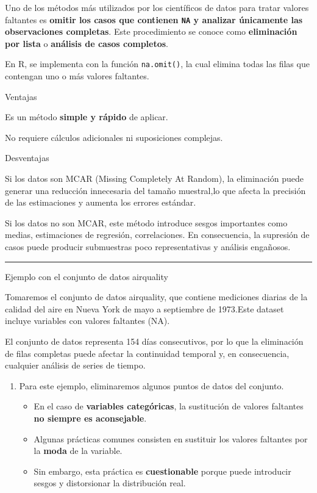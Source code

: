 \documentclass[
]{book}
\providecommand{\tightlist}{%
  \setlength{\itemsep}{0pt}\setlength{\parskip}{0pt}}
\begin{document}
Uno de los métodos más utilizados por los científicos de datos para tratar valores faltantes es \textbf{omitir los casos que contienen \texttt{NA} y analizar únicamente las observaciones completas}. Este procedimiento se conoce como \textbf{eliminación por lista} o \textbf{análisis de casos completos}.

En R, se implementa con la función \texttt{na.omit()}, la cual elimina todas las filas que contengan uno o más valores faltantes.

{} Ventajas

Es un método \textbf{simple y rápido} de aplicar.

No requiere cálculos adicionales ni suposiciones complejas.

{}Desventajas

Si los datos son MCAR (Missing Completely At Random), la eliminación puede generar una reducción innecesaria del tamaño muestral,lo que afecta la precisión de las estimaciones y aumenta los errores estándar.

Si los datos no son MCAR, este método introduce sesgos importantes como medias, estimaciones de regresión, correlaciones. En consecuencia, la supresión de casos puede producir submuestras poco representativas y análisis engañosos.

\begin{center}\rule{0.5\linewidth}{0.5pt}\end{center}

{} Ejemplo con el conjunto de datos airquality

Tomaremos el conjunto de datos airquality, que contiene mediciones diarias de la calidad del aire en Nueva York de mayo a septiembre de 1973.Este dataset incluye variables con valores faltantes (NA).

El conjunto de datos representa 154 días consecutivos, por lo que la eliminación de filas completas puede afectar la continuidad temporal y, en consecuencia, cualquier análisis de series de tiempo.

\begin{enumerate}
\def\labelenumi{\arabic{enumi}.}
\tightlist
\item
  Para este ejemplo, eliminaremos algunos puntos de datos del conjunto.

  \begin{itemize}
  \tightlist
  \item
    En el caso de \textbf{variables categóricas}, la sustitución de valores faltantes \textbf{no siempre es aconsejable}.\\
  \item
    Algunas prácticas comunes consisten en sustituir los valores faltantes por la \textbf{moda} de la variable.\\
  \item
    Sin embargo, esta práctica es \textbf{cuestionable} porque puede introducir sesgos y distorsionar la distribución real.
  \end{itemize}
\end{enumerate}
\end{document}
